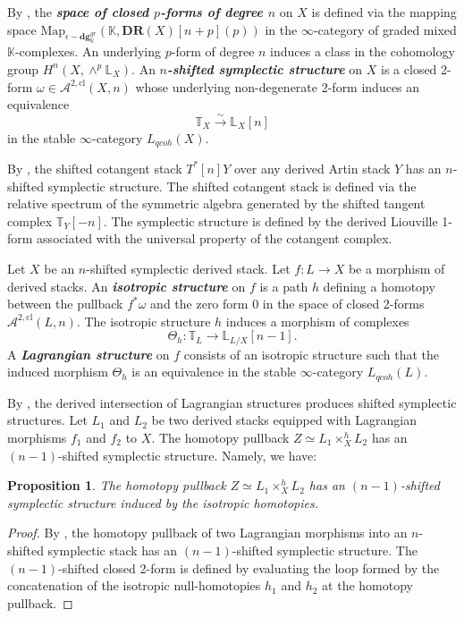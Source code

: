 \documentclass[reqno]{amsart}
\newcommand{\bfem}[1]{\textbf{\textit{#1}}}
\newcommand{\LL}{\mathbb{L}}
\newcommand{\TT}{\mathbb{T}}
\newcommand{\K}{\mathbb{K}}
\newtheorem{proposition}[theorem]{Proposition}
\begin{document}
By \cite[Definition 1.12]{PTVV}, the \bfem{space of closed $p$-forms of degree $n$} on $X$ is defined via the mapping space $\mathrm{Map}_{\epsilon-\mathbf{dg}_\K^{gr}}(\K, \mathbf{DR}(X)[n+p](p))$ in the $\infty$-category of graded mixed $\K$-complexes. An underlying $p$-form of degree $n$ induces a class in the cohomology group $H^{n}(X, \wedge^{p} \LL_{X})$. An \bfem{$n$-shifted symplectic structure} on $X$ is a closed 2-form $\omega \in \mathcal{A}^{2, \mathrm{cl}}(X, n)$ whose underlying non-degenerate 2-form induces an equivalence 
\[
    \TT_{X} \xrightarrow{\sim} \LL_{X}[n]
\]in the stable $\infty$-category $L_{qcoh}(X)$.

By \cite[Theorem 2.1]{Calaque}, the shifted cotangent stack $T^{*}[n]Y$ over any derived Artin stack $Y$ has an $n$-shifted symplectic structure. The shifted cotangent stack is defined via the relative spectrum of the symmetric algebra generated by the shifted tangent complex $\TT_{Y}[-n]$. The symplectic structure is defined by the derived Liouville 1-form associated with the universal property of the cotangent complex.

Let $X$ be an $n$-shifted symplectic derived stack. Let $f \colon L \to X$ be a morphism of derived stacks. An \bfem{isotropic structure} on $f$ is a path $h$ defining a homotopy between the pullback $f^{*}\omega$ and the zero form $0$ in the space of closed 2-forms $\mathcal{A}^{2, \mathrm{cl}}(L, n)$. The isotropic structure $h$ induces a morphism of complexes
\[
    \Theta_h:\TT_{L} \to \LL_{L/X}[n-1].
\]
A \bfem{Lagrangian structure} on $f$ consists of an isotropic structure such that the induced morphism $\Theta_h$ is an equivalence in the stable $\infty$-category $L_{qcoh}(L)$. 

By \cite[Theorem 2.9]{PTVV}, the derived intersection of Lagrangian structures produces shifted symplectic structures. Let $L_{1}$ and $L_{2}$ be two derived stacks equipped with Lagrangian morphisms $f_{1}$ and $f_{2}$ to $X$. 
The homotopy pullback $Z \simeq L_{1} \times_{X}^{h} L_{2}$ has an $(n-1)$-shifted symplectic structure. Namely, we have:

\begin{proposition}
The homotopy pullback $Z \simeq L_{1} \times_{X}^{h} L_{2}$ has an $(n-1)$-shifted symplectic structure induced by the isotropic homotopies.
\end{proposition}
\begin{proof}
By \cite[Theorem 2.9]{PTVV}, the homotopy pullback of two Lagrangian morphisms into an $n$-shifted symplectic stack has an $(n-1)$-shifted symplectic structure. The $(n-1)$-shifted closed 2-form is defined by evaluating the loop formed by the concatenation of the isotropic null-homotopies $h_1$ and $h_2$ at the homotopy pullback.

\end{proof}
\end{document}
